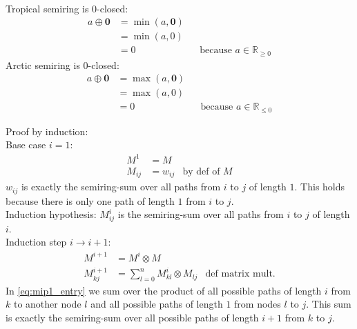\documentclass[a4paper,12pt]{ETHexercise}
\begin{document}
\begin{question}\\
	\begin{subquestion}
		Tropical semiring is $0$-closed:
		\begin{align}
			a \oplus \boldsymbol{0} & = \min(a, \boldsymbol{0})                                                 \\
			                        & = \min(a, 0)                                                              \\
			                        & = 0                       &  & \text{because $a \in \mathbb{R}_{\geq 0}$}
		\end{align}
		Arctic semiring is $0$-closed:
		\begin{align}
			a \oplus \boldsymbol{0} & = \max(a, \boldsymbol{0})                                                 \\
			                        & = \max(a, 0)                                                              \\
			                        & = 0                       &  & \text{because $a \in \mathbb{R}_{\leq 0}$}
		\end{align}
	\end{subquestion}
	\begin{subquestion}
		Proof by induction:\\
		Base case $i = 1$:
		\begin{align}
			M^1    & = M                             \\
			M_{ij} & = w_{ij} & \text{by def of $M$}
		\end{align}
		$w_{ij}$ is exactly the semiring-sum over all paths from $i$ to $j$ of length $1$. This holds because there is only one path of length $1$ from $i$ to $j$.\\
		Induction hypothesis:
		$M^{i}_{ij}$ is the semiring-sum over all paths from $i$ to $j$ of length $i$.\\
		Induction step $i \rightarrow i + 1$:\\
		\begin{align}
			M^{i + 1}    & = M^i \otimes M                                                                            \\
			M^{i+1}_{kj} & = \sum_{l=0}^{n} M^{i}_{kl} \otimes M_{lj} & \text{def matrix mult.} \label{eq:mip1_entry}
		\end{align}
		In \cref*{eq:mip1_entry} we sum over the product of all possible paths of length $i$ from $k$ to another node $l$ and all possible paths of length $1$ from nodes $l$ to $j$. This sum is exactly the semiring-sum over all possible paths of length $i + 1$ from $k$ to $j$.\\
	\end{subquestion}
\end{question}
\end{document}
